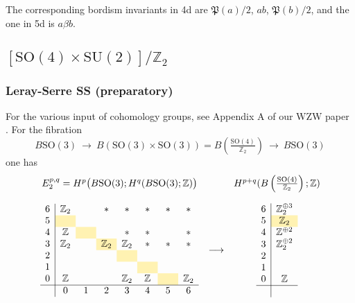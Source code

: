 \documentclass[12pt]{article}
\numberwithin{equation}{section}
\def\bZ{\mathbb{Z}}
\def\fP{\mathfrak{P}}
\def\SU{\mathrm{SU}}
\def\SO{\mathrm{SO}}
\begin{document}
The corresponding bordism invariants in 4d are $\fP(a)/2$, $ab$, $\fP(b)/2$, 
and the one in 5d is $a\beta b$.

\subsection{$[\SO(4)\times \SU(2)]/\bZ_2$}
\label{sec:so4su2}

\subsubsection{Leray-Serre SS (preparatory)}
For the various input of cohomology groups, see Appendix A of our WZW paper \cite{Lee:2020ojw}.
For the fibration
\begin{equation}
	B\SO(3)
	\ \to\ 
	B\left(\SO(3)\times \SO(3)\right)
	=
	B\left(\tfrac{\SO(4)}{\bZ_2}\right)
	\ \to\ 
	B\SO(3)
\end{equation}
one has
\begin{equation}
	\begin{array}{ccc}
		E_2^{p,q}=H^p\big(B\SO(3);H^q(B\SO(3);\bZ)\big) && H^{p+q}(B\left(\tfrac{\SO(4)}{\bZ_2}\right);\bZ)\vspace{4mm}\\
		\begin{array}{c|ccccccccccccc}
			6 & \bZ_2 && \ast & \ast & \ast & \ast & \ast \\
			5  & \hphantom{\bZ_2}\cellcolor{lightyellow} & \hphantom{\bZ_2} & \hphantom{\bZ_2} & \hphantom{\bZ_2} & \hphantom{\bZ_2} & \hphantom{\bZ_2} \\
			4  & \bZ & \cellcolor{lightyellow} && \ast & \ast && \ast\\
			3  & \bZ_2 && \bZ_2\cellcolor{lightyellow} & \bZ_2 & \ast & \ast & \ast \\
			2  & &  && \cellcolor{lightyellow} &&\\
			1  &  &&  && \cellcolor{lightyellow} &&\\
			0 & \bZ &  && \bZ_2 & \bZ & \cellcolor{lightyellow} & \bZ_2\\
			\hline
			& 0 & 1 & 2 & 3 & 4 & 5 & 6 \\
		\end{array}
		& \longrightarrow & 
		\begin{array}{c|c}
			6  &\bZ_2^{\oplus 3}\\
			5  & \bZ_2\cellcolor{lightyellow}\\
			4  & \bZ^{\oplus 2}\\
			3  & \bZ_2^{\oplus 2}\\
			2  & \\
			1  & \\
			0 & \bZ\\
			\hline\\
		\end{array}
	\end{array}
\end{equation}
\end{document}
